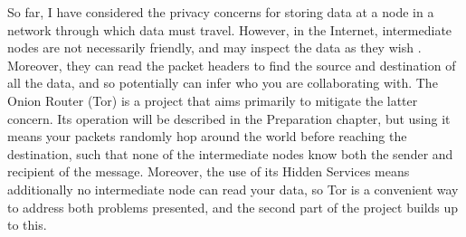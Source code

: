\documentclass[diss.tex]{subfiles}
\begin{document}
So far, I have considered the privacy concerns for storing data at a node in a network through which data must travel. However, in the Internet, intermediate nodes are not necessarily friendly, and may inspect the data as they wish \cite{deeppacketinspection}. Moreover, they can read the packet headers to find the source and destination of all the data, and so potentially can infer who you are collaborating with. The Onion Router (Tor) is a project that aims primarily to mitigate the latter concern. Its operation will be described in the Preparation chapter, but using it means your packets randomly hop around the world before reaching the destination, such that none of the intermediate nodes know both the sender and recipient of the message. Moreover, the use of its Hidden Services means additionally no intermediate node can read your data, so Tor is a convenient way to address both problems presented, and the second part of the project builds up to this.
\end{document}
